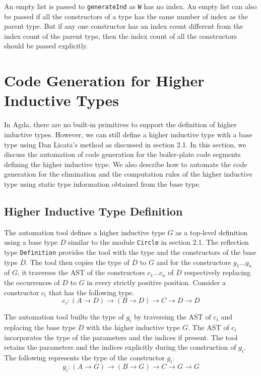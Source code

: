 \documentclass[sigplan,10pt]{acmart}
\begin{document}
An empty list is passed to {\tt generateInd} as {\tt W} has no index. An empty list can also be passed if all the constructors of a type has the same number of index as the parent type. But if any one constructor has an index count different from the index count of the parent type, then the index count of all the constructors should be passed explicitly.

\section{Code Generation for Higher Inductive Types}
\label{sec:sec4}

In Agda, there are no built-in primitives to support the definition of higher inductive types. However, we can still define a higher inductive type with a base type using Dan Licata's \citep{Licata-2011} method as discussed in section 2.1. In this section, we discuss the automation of code generation for the boiler-plate code segments defining the higher inductive type. We also describe how to automate the code generation for the elimination and the computation rules of the higher inductive type using static type information obtained from the base type.


\subsection{Higher Inductive Type Definition}
\label{sec:sec4.1}

The automation tool defines a higher inductive type $G$ as a top-level definition using a base type $D$ similar to the module {\tt Circle} in section 2.1. The reflection type {\tt Definition} provides the tool with the type and the constructors of the base type $D$. The tool then copies the type of $D$ to $G$ and for the constructors $g_1 \ldots g_n$ of $G$, it traverses the AST of the constructors $c_1 \ldots c_n$ of $D$ respectively replacing the occurrences of $D$ to $G$ in every strictly positive position. Consider a constructor $c_i$ that has the following type.
\begin{equation*}
c_i : (A \rightarrow D) \rightarrow (B \rightarrow D) \rightarrow C \rightarrow D \rightarrow D
\end{equation*}

The automation tool builts the type of $g_i$ by traversing the AST of $c_i$ and replacing the base type $D$ with the higher inductive type $G$. The AST of $c_i$ incorporates the type of the parameters and the indices if present. The tool retains the parameters and the indices explicitly during the construction of $g_i$. The following represents the type of the constructor $g_i$.
\begin{equation*}
g_i : (A \rightarrow G) \rightarrow (B \rightarrow G) \rightarrow C \rightarrow G \rightarrow G
\end{equation*}
\end{document}
